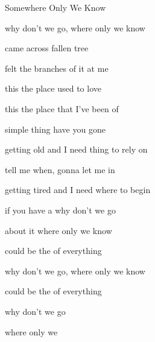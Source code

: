 \begin{SBSong}{Somewhere Only We Know}
\begin{SBVerse}
     why don't we go, where only we know
  \end{SBVerse}
  \begin{SBVerse}
     came across  fallen tree
    
     felt the branches of it  at me
    
     this the place  used to love
    
     this the place that I've been  of
  \end{SBVerse}
  
  \begin{SBVerse}
     simple thing  have you gone
    
     getting old and I need thing to rely on
    
     tell me when,  gonna let me in
    
     getting tired and I need where to begin
  \end{SBVerse}
  \WBPageBrk
  \begin{SBVerse}
     if you have a  why don't we go
    
     about it where only we know
    
     could be the  of everything
    
     why don't we go, where only we know
  \end{SBVerse} 
  \begin{SBVerse}
      could be the  of everything
     
      why don't we go
     
     where only we  
  \end{SBVerse}
\end{SBSong}
